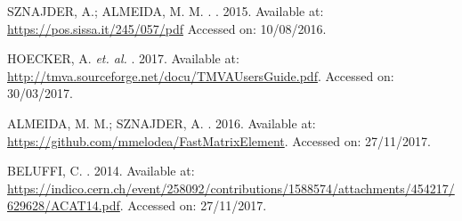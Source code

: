 \begin{thebibliography}{}
SZNAJDER, A.; ALMEIDA, M. M.
.
.
2015.
Available at: \url{https://pos.sissa.it/245/057/pdf}
Accessed on: 10/08/2016.

HOECKER, A.  \textit{et. al.}
.
2017.
Available at: \url{http://tmva.sourceforge.net/docu/TMVAUsersGuide.pdf}.
Accessed on: 30/03/2017.


ALMEIDA, M. M.; SZNAJDER, A.
. 
2016.
Available at: \url{https://github.com/mmelodea/FastMatrixElement}.
Accessed on: 27/11/2017.

BELUFFI, C. . 2014. Available at: \url{https://indico.cern.ch/event/258092/contributions/1588574/attachments/454217/629628/ACAT14.pdf}. Accessed on: 27/11/2017.

\end{thebibliography}
